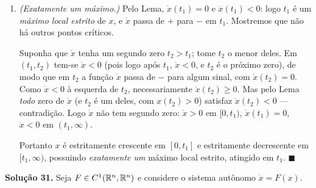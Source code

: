 \begin{enumerate}[label=(\alph*)]
\emph{Observação honesta.} O passo verdadeiramente delicado é garantir que a órbita atinge $x=\xi_c$ \emph{antes} que $y$ desça abaixo de $a_4/a_3$; a desigualdade \eqref{eq:Qxd} ($\xi_c<\xi_d=a_1/(a_2-a_4)$), consequência exata das hipóteses \eqref{eq:hyp30}, é o que torna a região $\{x<\xi_c\}$ um regime em que \eqref{eq:xdotlb30} força crescimento estrito de $x$. A identidade algébrica $a_3x\,g(x)=Q(x)$ (equivalentemente $P\equiv-Q$) localiza todos os possíveis cruzamentos $\dot y=0$ (com $\dot x>0$) em $\{x<\xi_c\}$, e a monotonia de $x$ neste regime impede que ocorram, encurralando o primeiro zero de $\dot x$ em $x^*>\xi_c$.

\item \emph{(Exatamente um máximo.)}
Pelo Lema, $\dot x(t_1)=0$ e $\ddot x(t_1)<0$: logo $t_1$ é um \emph{máximo local estrito} de $x$, e $\dot x$ passa de $+$ para $-$ em $t_1$. Mostremos que não há outros pontos críticos.

Suponha que $\dot x$ tenha um segundo zero $t_2>t_1$; tome $t_2$ o menor deles. Em $(t_1,t_2)$ tem-se $\dot x<0$ (pois logo após $t_1$, $\dot x<0$, e $t_2$ é o próximo zero), de modo que em $t_2$ a função $\dot x$ passa de $-$ para algum sinal, com $\dot x(t_2)=0$. Como $\dot x<0$ à esquerda de $t_2$, necessariamente $\ddot x(t_2)\ge0$. Mas pelo Lema \emph{todo} zero de $\dot x$ (e $t_2$ é um deles, com $x(t_2)>0$) satisfaz $\ddot x(t_2)<0$ --- contradição. Logo $\dot x$ não tem segundo zero: $\dot x>0$ em $[0,t_1)$, $\dot x(t_1)=0$, $\dot x<0$ em $(t_1,\infty)$.

Portanto $x$ é estritamente crescente em $[0,t_1]$ e estritamente decrescente em $[t_1,\infty)$, possuindo \emph{exatamente um} máximo local estrito, atingido em $t_1$. \qquad$\blacksquare$

\end{enumerate}


\bigskip\noindent\textbf{Solução 31.}\quad
Seja $F\in C^1(\mathbb{R}^n,\mathbb{R}^n)$ e considere o sistema autônomo $\dot x=F(x)$.

